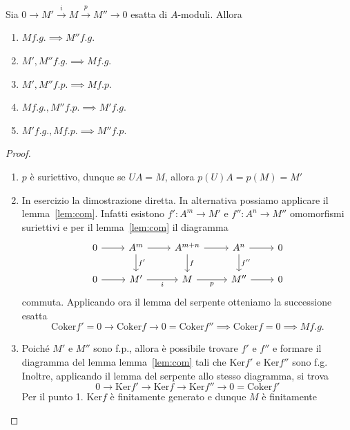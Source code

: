 \begin{proposition}{}
\label{prop:varie}
    Sia \(0 \to M' \overset{i}{\to } M \overset{p}{\to } M'' \to 0\) esatta di
    \(A\)-moduli. Allora
\begin{enumerate}[label = \arabic*.]
    \item[0.] \(M f.g. \implies M'' f.g.\) 
    \item \(M', M'' f.g. \implies M f.g.\) 
    \item \(M', M'' f.p. \implies M f.p.\) 
    \item \(M f.g., M'' f.p. \implies M' f.g.\) 
    \item \(M' f.g., M f.p. \implies M'' f.p.\) 
\end{enumerate}
\end{proposition}
\begin{proof}{} \( \) 
\begin{enumerate}[label = \arabic*.]
    \item[0.] \(p\) è suriettivo, dunque se \(UA = M\), allora \(p(U)A = p(M) = M'\)
    \item In esercizio la dimostrazione diretta. In alternativa possiamo
        applicare il lemma~\ref{lem:com}. Infatti esistono \(f': A^{m} \to M'\) e \(f'' : A^{n} \to M''\) omomorfismi suriettivi e per il lemma~\ref{lem:com} il diagramma
\[\begin{tikzcd}
	0 & A^{m} & A^{m+n} & A^{n} & 0 \\
	0 & M' & M & M'' & 0
	\arrow[from=1-1, to=1-2]
	\arrow[from=1-2, to=1-3]
	\arrow["{f'}", from=1-2, to=2-2]
	\arrow[from=1-3, to=1-4]
	\arrow["f", from=1-3, to=2-3]
	\arrow[from=1-4, to=1-5]
	\arrow["{f''}", from=1-4, to=2-4]
	\arrow[from=2-1, to=2-2]
	\arrow["i"', from=2-2, to=2-3]
	\arrow["p"', from=2-3, to=2-4]
	\arrow[from=2-4, to=2-5]
\end{tikzcd}\]
    commuta. Applicando ora il lemma del serpente otteniamo la successione
    esatta 
    \[
      \mathrm{Coker}f' = 0 \to \mathrm{Coker}f \to  0= \mathrm{Coker} f''
      \implies \mathrm{Coker} f = 0 \implies M f.g.
    \]
    \item Poiché \(M'\) e \(M''\) sono f.p., allora è possibile trovare \(f'\) e
        \(f''\) e formare il diagramma del lemma lemma~\ref{lem:com} tali che
        \(\mathrm{Ker}f'\) e \(\mathrm{Ker}f''\) sono f.g.
        Inoltre, applicando il lemma del serpente allo stesso diagramma, si
        trova
    \[
    0 \to \mathrm{Ker} f' \to \mathrm{Ker} f \to \mathrm{Ker}f'' \to 0 = \mathrm{Coker} f'
    \]
    Per il punto 1. \(\mathrm{Ker} f\) è finitamente generato e dunque \(M\) è finitamente

\end{enumerate}
\end{proof}

